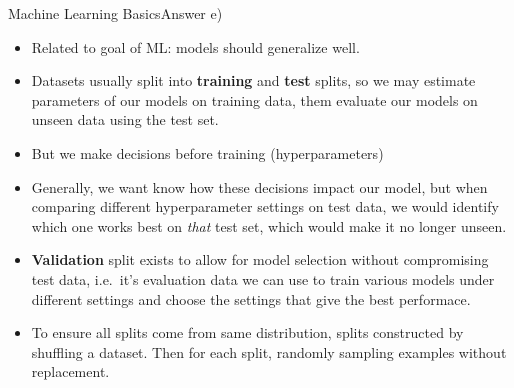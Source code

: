 \documentclass[t]{beamer}
\begin{document}
\begin{frame}{Machine Learning Basics}{Answer e)}
    \begin{itemize}
        \item Related to goal of ML: models should
              generalize well.
        \item Datasets usually split into \textbf{training} and
              \textbf{test} splits, so we may estimate parameters of our
              models on training data, them evaluate our models on
              unseen data using the test set.
        \item But we make decisions before training (hyperparameters)
        \item Generally, we want know how these decisions impact our
              model, but when comparing different hyperparameter
              settings on test data, we would identify which one
              works best on \emph{that} test set, which would make it
              no longer unseen.
        \item \textbf{Validation} split exists to allow for model
              selection without compromising test data, i.e.\ it's
              evaluation data we can use to train various models under
              different settings and choose the settings that give the
              best performace.
        \item To ensure all splits come from same distribution, splits
              constructed by shuffling a dataset. Then for each split, randomly
              sampling examples without replacement.
    \end{itemize}
\end{frame}
\end{document}
